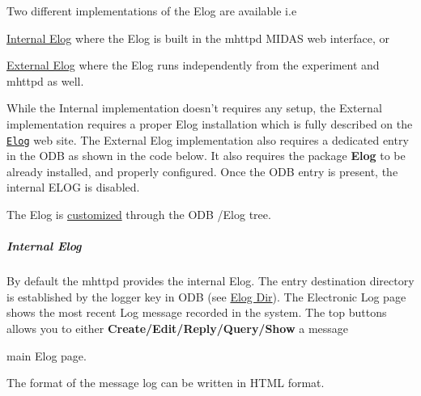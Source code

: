 Two different implementations of the Elog are available i.e
\begin{DoxyItemize}
\item \hyperlink{RC_mhttpd_Elog_page_RC_mhttpd_Internal_Elog}{Internal Elog} where the Elog is built in the mhttpd MIDAS web interface, or
\item \hyperlink{RC_mhttpd_Elog_page_RC_mhttpd_External_Elog}{External Elog} where the Elog runs independently from the experiment and mhttpd as well.
\end{DoxyItemize}

While the Internal implementation doesn't requires any setup, the External implementation requires a proper Elog installation which is fully described on the \href{http://midas.psi.ch/elog/}{\tt Elog} web site. The External Elog implementation also requires a dedicated entry in the ODB as shown in the code below. It also requires the package {\bfseries Elog} to be already installed, and properly configured. Once the ODB entry is present, the internal ELOG is disabled. \par
 The Elog is \hyperlink{F_Elog_F_Elog_Custom}{customized} through the ODB /Elog tree.



 \label{RC_mhttpd_Elog_page_idx_Elog_internal}
\hypertarget{RC_mhttpd_Elog_page_idx_Elog_internal}{}
 \hypertarget{RC_mhttpd_Elog_page_RC_mhttpd_Internal_Elog}{}\subparagraph{Internal Elog}\label{RC_mhttpd_Elog_page_RC_mhttpd_Internal_Elog}
By default the mhttpd provides the internal Elog. The entry destination directory is established by the logger key in ODB (see \hyperlink{F_Elog_F_Logger_Elog_Dir}{Elog Dir}). The Electronic Log page shows the most recent Log message recorded in the system. The top buttons allows you to either {\bfseries Create/Edit/Reply/Query/Show} a message

\par
\par
\par
 \begin{center}  main Elog page. \par
\par
\par
  \end{center}  \par
\par
\par


The format of the message log can be written in HTML format.


